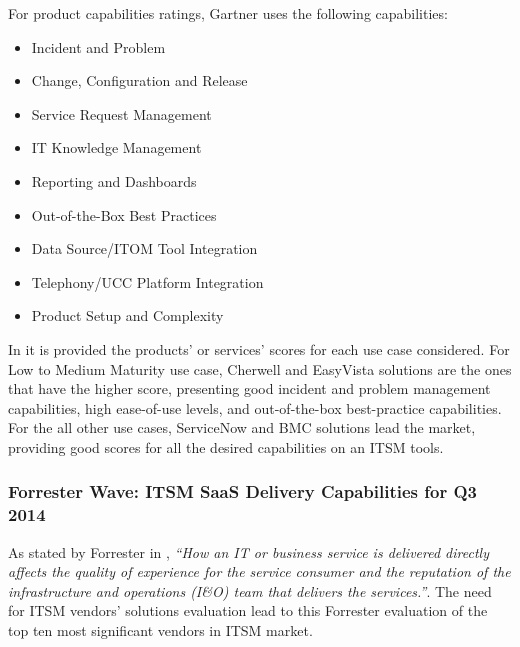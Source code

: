 For product capabilities ratings, Gartner uses the following capabilities:

\begin{itemize}
\item Incident and Problem
\item Change, Configuration and Release
\item Service Request Management
\item IT Knowledge Management
\item Reporting and Dashboards
\item Out-of-the-Box Best Practices
\item Data Source/ITOM Tool Integration
\item Telephony/UCC Platform Integration
\item Product Setup and Complexity
\end{itemize}

In \cite{criticalCapabilitiesITSM} it is provided the products' or services' scores for each use case considered. For Low to Medium Maturity use case, Cherwell and EasyVista solutions are the ones that have the higher score, presenting good incident and problem management capabilities, high ease-of-use levels, and out-of-the-box best-practice capabilities. For the all other use cases, ServiceNow and BMC solutions lead the market, providing good scores for all the desired capabilities on an ITSM tools.\par


\subsubsection{Forrester Wave: ITSM SaaS Delivery Capabilities for Q3 2014}

As stated by Forrester in \cite{forresterWaveITSM}, \textit{``How an IT or business service is delivered directly affects the quality of experience for the service consumer and the reputation of the infrastructure and operations (I\&O) team that delivers the services.''}. The need for ITSM vendors' solutions evaluation lead to this Forrester evaluation of the top ten most significant vendors in ITSM market.\par


